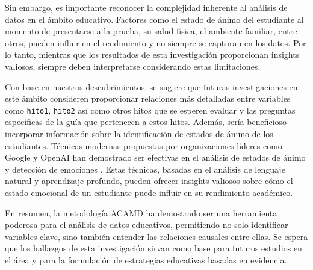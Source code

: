 Sin embargo, es importante reconocer la complejidad inherente al análisis de datos en el ámbito educativo. Factores como el estado de ánimo del estudiante al momento de presentarse a la prueba, su salud física, el ambiente familiar, entre otros, pueden influir en el rendimiento y no siempre se capturan en los datos. Por lo tanto, mientras que los resultados de esta investigación proporcionan insights valiosos, siempre deben interpretarse considerando estas limitaciones.

Con base en nuestros descubrimientos, se sugiere que futuras investigaciones en este ámbito consideren proporcionar relaciones más detalladas entre variables como \texttt{hito1}, \texttt{hito2} así como otros hitos que se esperen evaluar y las preguntas específicas de la guía que pertenecen a estos hitos. Además, sería beneficioso incorporar información sobre la identificación de estados de ánimo de los estudiantes. Técnicas modernas propuestas por organizaciones líderes como Google y OpenAI han demostrado ser efectivas en el análisis de estados de ánimo y detección de emociones \cite{google_mood_tracking_2022, google_sentiment_api_2022, openai_sentiment_neuron_2022, openai_sentiment_analysis_2022, openai_gpt_emotion_2022, openai_chatgpt_emotion_2023}. Estas técnicas, basadas en el análisis de lenguaje natural y aprendizaje profundo, pueden ofrecer insights valiosos sobre cómo el estado emocional de un estudiante puede influir en su rendimiento académico.

En resumen, la metodología ACAMD ha demostrado ser una herramienta poderosa para el análisis de datos educativos, permitiendo no solo identificar variables clave, sino también entender las relaciones causales entre ellas. Se espera que los hallazgos de esta investigación sirvan como base para futuros estudios en el área y para la formulación de estrategias educativas basadas en evidencia.
